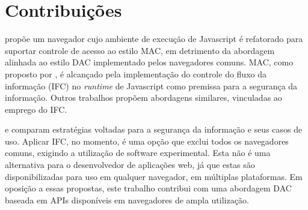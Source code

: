 \section{Contribuições}

\cite{Stefan2014} propõe um navegador cujo ambiente de execução de Javascript é refatorado para suportar controle de acesso ao estilo MAC, em detrimento da abordagem alinhada ao estilo DAC implementado pelos navegadores comuns. MAC, como proposto por \cite{Stefan2014}, é alcançado pela implementação do controle do fluxo da informação (IFC) no \textit{runtime} de Javascript como premissa para a segurança da informação. Outros trabalhos \cite{Hedin2016, Bichhawat2014} propõem abordagens similares, vinculadas ao emprego do IFC.

\cite{Magazinius2014} e \cite{DeRyck2012} comparam estratégias voltadas para a segurança da informação e seus casos de uso. Aplicar IFC, no momento, é uma opção que exclui todos os navegadores comuns, exigindo a utilização de software experimental. Esta não é uma alternativa para o desenvolvedor de aplicações web, já que estas são disponibilizadas para uso em qualquer navegador, em múltiplas plataformas. Em oposição a essas propostas, este trabalho contribui com uma abordagem DAC baseada em APIs disponíveis em navegadores de ampla utilização.

